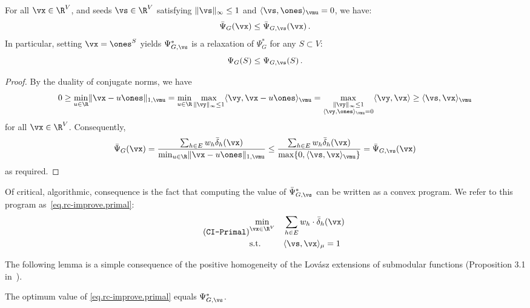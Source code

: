 \documentclass[letterpaper]{article}
\begin{document}
\begin{lemma}
\label{lem.rc-improve.relaxation}
For all $\vx \in \R^V$, and seeds $\vs \in \R^V$ satisfying $\lVert \vs \rVert_{\infty} \leq 1$ and $\langle \vs, \ones \rangle_{\vmu} = 0$, we have:
\begin{equation*}
\bar{\Psi}_G(\vx) \leq \bar{\Psi}_{G, \vs}(\vx) \, .
\end{equation*}
In particular, setting $\vx = \ones^S$ yields $\Psi_{G, \vs}^*$ is a relaxation of $\Psi_G^*$ for any $S \subset V$:
\begin{equation*}
\Psi_G(S) \leq \Psi_{G,\vs}(S) \, .
\end{equation*}
\end{lemma}
\begin{proof}
By the duality of conjugate norms, we have
\begin{equation*}
0 \geq \min_{u \in \R} \lVert \vx - u \ones \rVert_{1, \vmu}
= \min_{u \in \R} \max_{\lVert \vy \rVert_\infty \leq 1} \langle \vy, \vx - u \ones \rangle_{\vmu}
= \max_{\substack{\lVert \vy\rVert_\infty \leq 1 \\ \langle \vy, \ones \rangle_{\vmu} = 0}} \langle \vy, \vx \rangle
\geq  \langle \vs, \vx \rangle_{\vmu}
\end{equation*}
for all $\vx \in \R^V$. Consequently,
\begin{equation*}
\bar{\Psi}_G(\vx)
= \frac{\sum_{h \in E} w_h \bar{\delta}_h(\vx)}{\min_{u \in \R} \lVert \vx - u \ones \rVert_{1, \vmu}}
\leq \frac{\sum_{h \in E} w_h \bar{\delta}_h(\vx)}{\max\{0,\langle \vs, \vx \rangle_{\vmu}\}}
= \bar{\Psi}_{G, \vs}(\vx)
\end{equation*}
as required.
\end{proof}

Of critical, algorithmic, consequence is the fact that computing the value of $\bar{\Psi}_{G, \vs}^*$ can be written as a convex program. We refer to this program as~\eqref{eq.rc-improve.primal}:
\begin{equation*}
\stepcounter{equation}
\tag{\texttt{CI-Primal}}
\label{eq.rc-improve.primal}
\begin{aligned}
& \underset{\vx \in \R^V}{\min}
& & \sum_{h \in E} w_h \cdot \bar{\delta}_{h}(\vx) \\
& \textup{s.t.}
& & \langle \vs, \vx \rangle_{\mu} = 1
\end{aligned}
\end{equation*}


The following lemma is a simple consequence of the positive homogeneity of the Lov\'asz extensions of submodular functions (Proposition 3.1 in~\cite{bach2013learning}).
\begin{lemma}
\label{lem.rc-improve.primal-val}
The optimum value of \eqref{eq.rc-improve.primal} equals $\Psi^*_{G,\vs}$.
\end{lemma}
\end{document}
